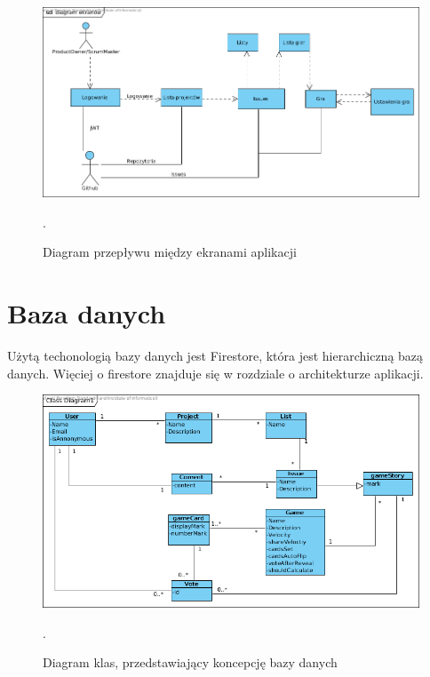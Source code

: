 \begin{figure}[H]
	\centering\includegraphics[width=\textwidth]{img/ScreensDiagram}
	\caption{Diagram przepływu między ekranami aplikacji}.
	\label{rys:ScreensDiagram}
\end{figure}

\section{Baza danych}

Użytą techonologią bazy danych jest Firestore, która jest hierarchiczną bazą danych.
Więciej o firestore znajduje się w rozdziale o architekturze aplikacji.

\begin{figure}[H]
	\centering\includegraphics[width=\textwidth]{img/ClassDiagram}
	\caption{Diagram klas, przedstawiający koncepcję bazy danych}.
	\label{rys:ClassDiagram}
\end{figure}